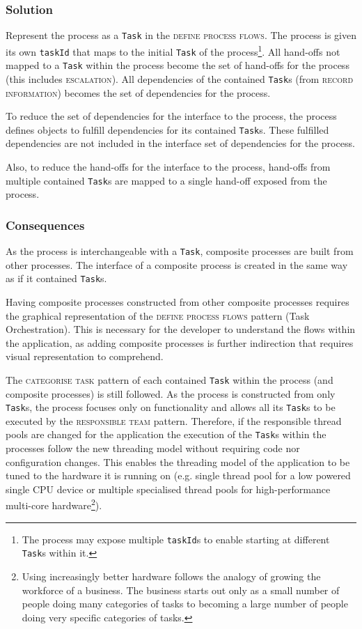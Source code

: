 \documentclass[prodmode]{style/acmlarge}
\begin{document}
\subsubsection*{Solution} Represent the process as a \texttt{Task} in the
\textsc{define process flows}.  The process is given its own \texttt{taskId}
that maps to the initial \texttt{Task} of the process\footnote{The process may
expose multiple \texttt{taskId}s to enable starting at different \texttt{Task}s
within it.}.  All hand-offs not mapped to a \texttt{Task} within the process
become the set of hand-offs for the process (this includes \textsc{escalation}).
All dependencies of the contained \texttt{Task}s (from \textsc{record
information}) becomes the set of dependencies for the process.

To reduce the set of dependencies for the interface to the process, the process
defines objects to fulfill dependencies for its contained \texttt{Task}s.  These
fulfilled dependencies are not included in the interface set of dependencies for
the process.

Also, to reduce the hand-offs for the interface to the process, hand-offs
from multiple contained \texttt{Task}s are mapped to a single hand-off exposed
from the process.

\subsubsection*{Consequences} As the process is interchangeable with a
\texttt{Task}, composite processes are built from other processes.  The
interface of a composite process is created in the same way as if it contained
\texttt{Task}s.

Having composite processes constructed from other composite processes requires
the graphical representation of the \textsc{define process flows} pattern (Task
Orchestration).  This is necessary for the developer to understand the flows
within the application, as adding composite processes is further indirection
that requires visual representation to comprehend.

The \textsc{categorise task} pattern of each contained \texttt{Task} within the
process (and composite processes) is still followed.  As the process is
constructed from only \texttt{Task}s, the process focuses only on functionality
and allows all its \texttt{Task}s to be executed by the \textsc{responsible
team} pattern.  Therefore, if the responsible thread pools are changed for the
application the execution of the \texttt{Task}s within the processes follow the new
threading model without requiring code nor configuration changes.  This enables
the threading model of the application to be tuned to the hardware it is running
on (e.g. single thread pool for a low powered single CPU device or multiple
specialised thread pools for high-performance multi-core hardware\footnote{Using
increasingly better hardware follows the analogy of growing the workforce of a
business.  The business starts out only as a small number of people doing many
categories of tasks to becoming a large number of people doing very specific
categories of tasks.}).
\end{document}
